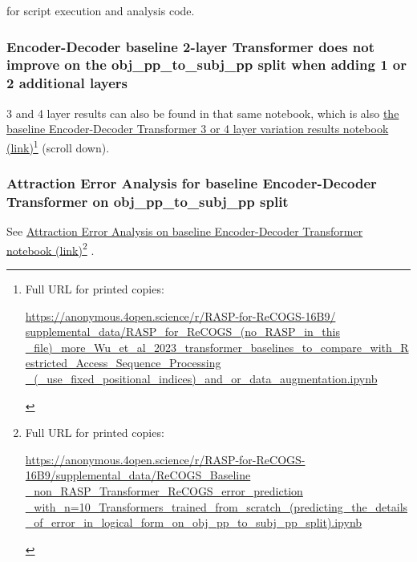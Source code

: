\documentclass[11pt]{article}
\begin{document}
for \cite{Wu2023} script execution and analysis code.

\subsubsection{\cite{Wu2023} Encoder-Decoder baseline 2-layer Transformer does not improve on the obj\_pp\_to\_subj\_pp split when adding 1 or 2 additional layers}

3 and 4 layer results can also be found in that same notebook, which is also \href{https://anonymous.4open.science/r/RASP-for-ReCOGS-16B9/supplemental\_data/RASP\_for\_ReCOGS\_(no\_RASP\_in\_this\_file)\_more\_Wu\_et\_al\_2023\_transformer\_baselines\_to\_compare\_with\_Restricted\_Access\_Sequence\_Processing\_(\_use\_fixed\_positional\_indices)\_and\_or\_data\_augmentation.ipynb}{the baseline Encoder-Decoder Transformer 3 or 4 layer variation results notebook (link)}\footnote{\begin{footnotesize}Full URL for printed copies: 

\href{https://anonymous.4open.science/r/RASP-for-ReCOGS-16B9/supplemental\_data/RASP\_for\_ReCOGS\_(no\_RASP\_in\_this\_file)\_more\_Wu\_et\_al\_2023\_transformer\_baselines\_to\_compare\_with\_Restricted\_Access\_Sequence\_Processing\_(\_use\_fixed\_positional\_indices)\_and\_or\_data\_augmentation.ipynb}{https://anonymous.4open.science/r/RASP-for-ReCOGS-16B9/
supplemental\_data/RASP\_for\_ReCOGS\_(no\_RASP\_in\_this
\_file)\_more\_Wu\_et\_al\_2023\_transformer\_baselines\_to\_compare\_with\_Restricted\_Access\_Sequence\_Processing
\_(\_use\_fixed\_positional\_indices)\_and\_or\_data\_augmentation.ipynb}\end{footnotesize}} (scroll down).

\subsubsection{Attraction Error Analysis for \cite{Wu2023} baseline Encoder-Decoder Transformer on obj\_pp\_to\_subj\_pp split}

See \href{https://anonymous.4open.science/r/RASP-for-ReCOGS-16B9/supplemental\_data/ReCOGS\_Baseline\_non\_RASP\_Transformer\_ReCOGS\_error\_prediction\_with\_n=10\_Transformers\_trained\_from\_scratch\_(predicting\_the\_details\_of\_error\_in\_logical\_form\_on\_obj\_pp\_to\_subj\_pp\_split).ipynb}{Attraction Error Analysis on baseline Encoder-Decoder Transformer notebook (link)}\footnote{\begin{footnotesize}Full URL for printed copies: 

\href{https://anonymous.4open.science/r/RASP-for-ReCOGS-16B9/supplemental\_data/ReCOGS\_Baseline\_non\_RASP\_Transformer\_ReCOGS\_error\_prediction\_with\_n=10\_Transformers\_trained\_from\_scratch\_(predicting\_the\_details\_of\_error\_in\_logical\_form\_on\_obj\_pp\_to\_subj\_pp\_split).ipynb}{https://anonymous.4open.science/r/RASP-for-ReCOGS-16B9/supplemental\_data/ReCOGS\_Baseline
\_non\_RASP\_Transformer\_ReCOGS\_error\_prediction
\_with\_n=10\_Transformers\_trained\_from\_scratch\_(predicting\_the\_details
\_of\_error\_in\_logical\_form\_on\_obj\_pp\_to\_subj\_pp\_split).ipynb}
\end{footnotesize}} .
\end{document}
